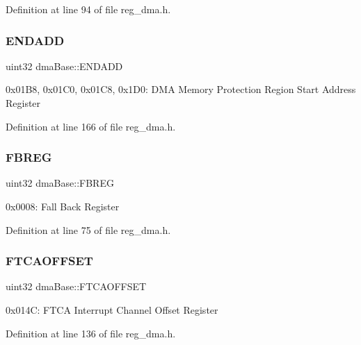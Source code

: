 Definition at line 94 of file reg\+\_\+dma.\+h.

\mbox{\label{structdmaBase_a64505f313f60d86380823659f296141b}} 
\subsubsection{\texorpdfstring{E\+N\+D\+A\+DD}{ENDADD}}
{\footnotesize\ttfamily uint32 dma\+Base\+::\+E\+N\+D\+A\+DD}

0x01\+B8, 0x01\+C0, 0x01\+C8, 0x1\+D0\+: D\+MA Memory Protection Region Start Address Register 

Definition at line 166 of file reg\+\_\+dma.\+h.

\mbox{\label{structdmaBase_a7ef7be833a8414c4cdfb86b82032183b}} 
\subsubsection{\texorpdfstring{F\+B\+R\+EG}{FBREG}}
{\footnotesize\ttfamily uint32 dma\+Base\+::\+F\+B\+R\+EG}

0x0008\+: Fall Back Register 

Definition at line 75 of file reg\+\_\+dma.\+h.

\mbox{\label{structdmaBase_afb8d236908e4b40e38dba4defc0c04db}} 
\subsubsection{\texorpdfstring{F\+T\+C\+A\+O\+F\+F\+S\+ET}{FTCAOFFSET}}
{\footnotesize\ttfamily uint32 dma\+Base\+::\+F\+T\+C\+A\+O\+F\+F\+S\+ET}

0x014C\+: F\+T\+CA Interrupt Channel Offset Register 

Definition at line 136 of file reg\+\_\+dma.\+h.

\mbox{\label{structdmaBase_a1cdd80a6d8815a765623386a097b4d6d}} 
